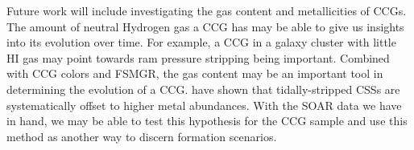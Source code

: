 \documentclass[iop,apj]{emulateapj}
\begin{document}
\noindent Future work will include investigating the gas content and metallicities of CCGs. The amount of neutral Hydrogen gas a CCG has may be able to give us insights into its evolution over time. For example, a CCG in a galaxy cluster with little HI gas may point towards ram pressure stripping being important. Combined with CCG colors and FSMGR, the gas content may be an important tool in determining the evolution of a CCG. \citet{Janz2015} have shown that tidally-stripped CSSs are systematically offset to higher metal abundances. With the SOAR data we have in hand, we may be able to test this hypothesis for the CCG sample and use this method as another way to discern formation scenarios.





\appendix
\label{app}
\end{document}
